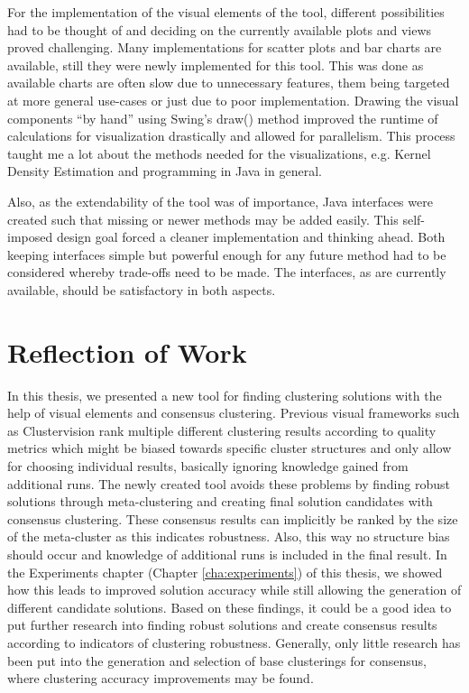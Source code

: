\documentclass[
	a4paper,
	english,
	twoside,
	openright,               
	11pt                            
	]{report}
\begin{document}
For the implementation of the visual elements of the tool, different possibilities had to be thought of and deciding on the currently available plots and views proved challenging. Many implementations for scatter plots and bar charts are available, still they were newly implemented for this tool. This was done as available charts are often slow due to unnecessary features, them being targeted at more general use-cases or just due to poor implementation. Drawing the visual components ``by hand'' using Swing's \cite{javaswing} draw() method improved the runtime of calculations for visualization drastically and allowed for parallelism. This process taught me a lot about the methods needed for the visualizations, e.g. Kernel Density Estimation and programming in Java in general. 

Also, as the extendability of the tool was of importance, Java interfaces were created such that missing or newer methods may be added easily. This self-imposed design goal forced a cleaner implementation and thinking ahead. Both keeping interfaces simple but powerful enough for any future method had to be considered whereby trade-offs need to be made. The interfaces, as are currently available, should be satisfactory in both aspects.

\section{Reflection of Work}
In this thesis, we presented a new tool for finding clustering solutions with the help of visual elements and consensus clustering. Previous visual frameworks such as Clustervision \cite{Kwon2018ClustervisionVS} rank multiple different clustering results according to quality metrics which might be biased towards specific cluster structures and only allow for choosing individual results, basically ignoring knowledge gained from additional runs. The newly created tool avoids these problems by finding robust solutions through meta-clustering and creating final solution candidates with consensus clustering. These consensus results can implicitly be ranked by the size of the meta-cluster as this indicates robustness. Also, this way no structure bias should occur and knowledge of additional runs is included in the final result. In the Experiments chapter (Chapter \ref{cha:experiments}) of this thesis, we showed how this leads to improved solution accuracy while still allowing the generation of different candidate solutions. Based on these findings, it could be a good idea to put further research into finding robust solutions and create consensus results according to indicators of clustering robustness. Generally, only little research has been put into the generation and selection of base clusterings for consensus, where clustering accuracy improvements may be found.
\end{document}
